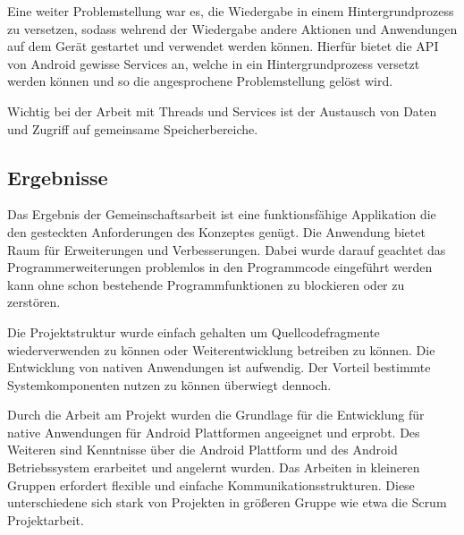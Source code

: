 Eine weiter Problemstellung war es, die Wiedergabe in einem Hintergrundprozess zu versetzen, sodass wehrend der Wiedergabe andere Aktionen und Anwendungen auf dem Gerät gestartet und verwendet werden können. Hierfür bietet die API von Android gewisse Services an, welche in ein Hintergrundprozess versetzt werden können und so die angesprochene Problemstellung gelöst wird.

Wichtig bei der Arbeit mit Threads und Services ist der Austausch von Daten und Zugriff auf gemeinsame Speicherbereiche.

\subsection{Ergebnisse}

Das Ergebnis der Gemeinschaftsarbeit ist eine funktionsfähige Applikation die den gesteckten Anforderungen des Konzeptes genügt. Die Anwendung bietet Raum für Erweiterungen und Verbesserungen. Dabei wurde darauf geachtet das Programmerweiterungen problemlos in den Programmcode eingeführt werden kann ohne schon bestehende Programmfunktionen zu blockieren oder zu zerstören.

Die Projektstruktur wurde einfach gehalten um Quellcodefragmente wiederverwenden zu können oder Weiterentwicklung betreiben zu können. Die Entwicklung von nativen Anwendungen ist aufwendig. Der Vorteil bestimmte Systemkomponenten nutzen zu können überwiegt dennoch.

Durch die Arbeit am Projekt wurden die Grundlage für die Entwicklung für native Anwendungen für Android Plattformen angeeignet und erprobt. Des Weiteren sind Kenntnisse über die Android Plattform und des Android Betriebssystem erarbeitet und angelernt wurden. Das Arbeiten in kleineren Gruppen erfordert flexible und einfache Kommunikationsstrukturen. Diese unterschiedene sich stark von Projekten in größeren Gruppe wie etwa die Scrum\cite{9783868998337} Projektarbeit.
